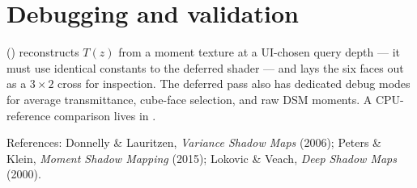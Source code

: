 \section{Debugging and validation}

 () reconstructs $T(z)$ from
a moment texture at a UI-chosen query depth --- it must use identical
constants to the deferred shader --- and
 lays the six faces out as a
$3\times2$ cross for inspection. The deferred pass also has dedicated debug
modes for average transmittance, cube-face selection, and raw DSM moments.
A CPU-reference comparison lives in
.

References: Donnelly \& Lauritzen, \emph{Variance Shadow Maps} (2006);
Peters \& Klein, \emph{Moment Shadow Mapping} (2015); Lokovic \& Veach,
\emph{Deep Shadow Maps} (2000).

